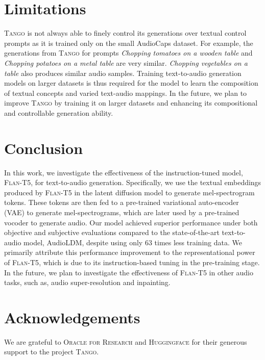 \documentclass{article}
\newcommand{\model}{\textsc{Tango}}
\begin{document}
\section{Limitations}
\model{} is not always able to finely control its generations over textual control prompts as it is trained only on the small AudioCaps dataset. For example, the generations from \model{} for prompts \textit{Chopping tomatoes on a wooden table} and \textit{Chopping potatoes on a metal table} are very similar. \textit{Chopping vegetables on a table} also produces similar audio samples. Training text-to-audio generation models on larger datasets is thus required for the model to learn the composition of textual concepts and varied text-audio mappings. In the future, we plan to improve \model{} by training it on larger datasets and enhancing its compositional and controllable generation ability.

\section{Conclusion}
In this work, we investigate the effectiveness of the instruction-tuned model, \textsc{Flan-T5}, for text-to-audio generation. Specifically, we use the textual embeddings produced by \textsc{Flan-T5} in the latent diffusion model to generate mel-spectrogram tokens. These tokens are then fed to a pre-trained variational auto-encoder (VAE) to generate mel-spectrograms, which are later used by a pre-trained vocoder to generate audio. Our model achieved superior performance under both objective and subjective evaluations compared to the state-of-the-art text-to-audio model, AudioLDM, despite using only 63 times less training data. We primarily attribute this performance improvement to the representational power of \textsc{Flan-T5}, which is due to its instruction-based tuning in the pre-training stage. In the future, we plan to investigate the effectiveness of \textsc{Flan-T5} in other audio tasks, such as, audio super-resolution and inpainting.

\section*{Acknowledgements}
We are grateful to \textsc{Oracle for Research} and \textsc{Huggingface} for their generous support to the project \model{}. 


\end{document}

